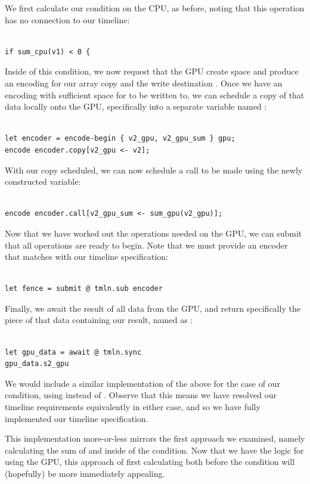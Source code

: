 %
We first calculate our condition on the CPU, as before, noting that this operation has no connection to our timeline:
%
\begin{lstlisting}

if sum_cpu(v1) < 0 {
\end{lstlisting}
%
Inside of this condition, we now request that the GPU create space and produce an encoding for our array copy  and the write destination .  Once we have an encoding with sufficient space for  to be written to, we can schedule a copy of that data locally onto the GPU, specifically into a separate variable named :
%
\begin{lstlisting}

let encoder = encode-begin { v2_gpu, v2_gpu_sum } gpu;
encode encoder.copy[v2_gpu <- v2];
\end{lstlisting}
%
With our copy scheduled, we can now schedule a call to be made using the newly constructed  variable:
%
\begin{lstlisting}

encode encoder.call[v2_gpu_sum <- sum_gpu(v2_gpu)];
\end{lstlisting}
%
Now that we have worked out the operations needed on the GPU, we can submit that all operations are ready to begin.  Note that we must provide an encoder that matches with our timeline specification:
%
\begin{lstlisting}
	
let fence = submit @ tmln.sub encoder
\end{lstlisting}
%

Finally, we await the result of all data from the GPU, and return specifically the piece of that data containing our result, named as :
%
\begin{lstlisting}
	
let gpu_data = await @ tmln.sync
gpu_data.s2_gpu
\end{lstlisting}
%
We would include a similar implementation of the above for the  case of our condition, using  instead of .  Observe that this means we have resolved our timeline requirements equivalently in either case, and so we have fully implemented our  timeline specification.

This implementation more-or-less mirrors the first approach we examined, namely calculating the sum of  and  inside of the condition.  Now that we have the logic for using the GPU, this approach of first calculating both before the condition will (hopefully) be more immediately appealing.

